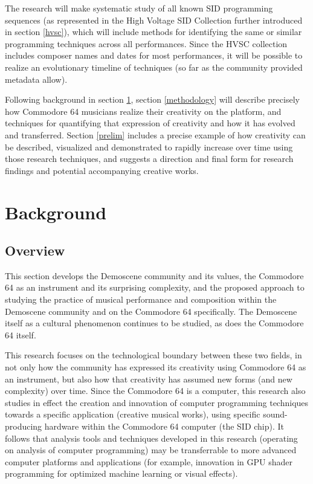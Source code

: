 \documentclass[10pt]{article}
\begin{document}
\begin{multicols*}{2}
The research will make systematic study of all known SID programming sequences (as represented in the High Voltage SID Collection\cite{hvsc} further introduced in section \ref{hvsc}), which will include methods for identifying the same or similar programming techniques across all performances. Since the HVSC collection includes composer names and dates for most performances, it will be possible to realize an evolutionary timeline of techniques (so far as the community provided metadata allow).

Following background in section \ref{background}, section \ref{methodology} will describe precisely how Commodore 64 musicians realize their creativity on the platform, and techniques for quantifying that expression of creativity and how it has evolved and transferred. Section \ref{prelim} includes a precise example of how creativity can be described, visualized and demonstrated to rapidly increase over time using those research techniques, and suggests a direction and final form for research findings and potential accompanying creative works.

  \section{Background}
  \label{background}

  \subsection{Overview}

This section develops the Demoscene community and its values, the Commodore 64 as an instrument and its surprising complexity, and the proposed approach to studying the practice of musical performance and composition within the Demoscene community and on the Commodore 64 specifically. The Demoscene itself as a cultural phenomenon continues to be studied, as does the Commodore 64 itself.

This research focuses on the technological boundary between these two fields, in not only how the community has expressed its creativity using Commodore 64 as an instrument, but also how that creativity has assumed new forms (and new complexity) over time. Since the Commodore 64 is a computer, this research also studies in effect the creation and innovation of computer programming techniques towards a specific application (creative musical works), using specific sound-producing hardware within the Commodore 64 computer (the SID chip). It follows that analysis tools and techniques developed in this research (operating on analysis of computer programming) may be transferrable to more advanced computer platforms and applications (for example, innovation in GPU shader programming
for optimized machine learning or visual effects\cite{10.1145/3534540.3534688}).


\end{multicols*}
\end{document}
